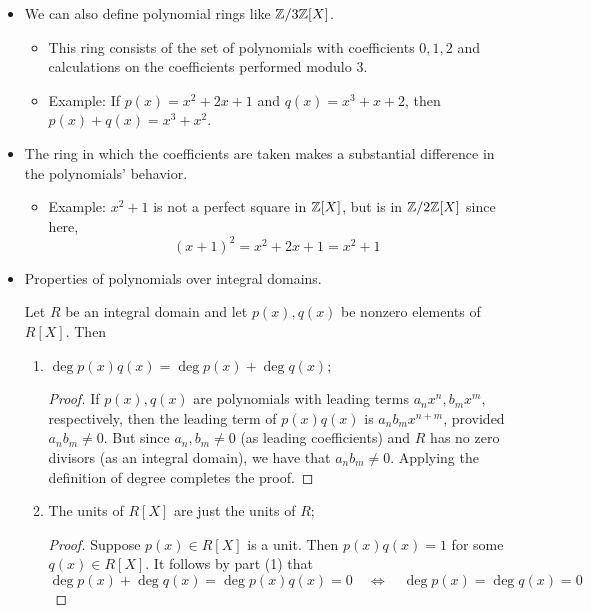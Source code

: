 \documentclass[../notes.tex]{subfiles}
\begin{document}
\begin{itemize}
    \item We can also define polynomial rings like $\mathbb{Z}/3\mathbb{Z}[X]$.
    \begin{itemize}
        \item This ring consists of the set of polynomials with coefficients $0,1,2$ and calculations on the coefficients performed modulo 3.
        \item Example: If $p(x)=x^2+2x+1$ and $q(x)=x^3+x+2$, then $p(x)+q(x)=x^3+x^2$.
    \end{itemize}
    \item The ring in which the coefficients are taken makes a substantial difference in the polynomials' behavior.
    \begin{itemize}
        \item Example: $x^2+1$ is not a perfect square in $\mathbb{Z}[X]$, but is in $\mathbb{Z}/2\mathbb{Z}[X]$ since here,
        \begin{equation*}
            (x+1)^2 = x^2+2x+1 = x^2+1
        \end{equation*}
    \end{itemize}
    \item Properties of polynomials over integral domains.
    \begin{proposition}\label{prp:7.4}
        Let $R$ be an integral domain and let $p(x),q(x)$ be nonzero elements of $R[X]$. Then
        \begin{enumerate}
            \item $\deg p(x)q(x)=\deg p(x)+\deg q(x)$;
            \begin{proof}
                If $p(x),q(x)$ are polynomials with leading terms $a_nx^n,b_mx^m$, respectively, then the leading term of $p(x)q(x)$ is $a_nb_mx^{n+m}$, provided $a_nb_m\neq 0$. But since $a_n,b_m\neq 0$ (as leading coefficients) and $R$ has no zero divisors (as an integral domain), we have that $a_nb_m\neq 0$. Applying the definition of degree completes the proof.
            \end{proof}
            \item The units of $R[X]$ are just the units of $R$;
            \begin{proof}
                Suppose $p(x)\in R[X]$ is a unit. Then $p(x)q(x)=1$ for some $q(x)\in R[X]$. It follows by part (1) that
                \begin{equation*}
                    \deg p(x)+\deg q(x) = \deg p(x)q(x) = 0
                    \quad\Longleftrightarrow\quad
                    \deg p(x)=\deg q(x) = 0
                \end{equation*}

\end{proof}
\end{enumerate}
\end{proposition}
\end{itemize}
\end{document}

